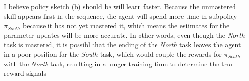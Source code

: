 \documentclass[a4paper,10pt]{article}
\begin{document}
I believe policy sketch (b) should be will learn faster.
Because the unmastered skill appears first in the sequence,
the agent will spend more time in subpolicy $\pi_{South}$
because it has not yet mastered it, which means the estimates
for the parameter updates will be more accurate. In other words,
even though the {\it North} task is mastered, it is possibl
that the ending of the {\it North} task leaves the agent
in a poor position for the {\it South} task, which would couple
the rewards for $\pi_{South}$ with the {\it North} task,
resulting in a longer training time to determine the true reward
signals.
\end{document}
